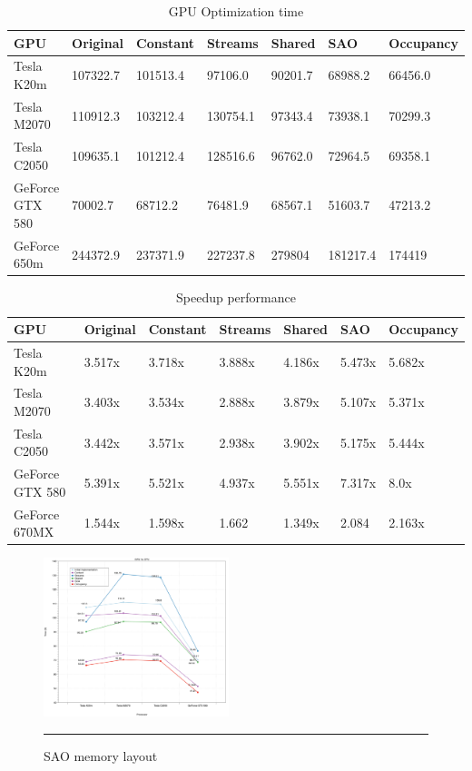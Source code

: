 \begin{table}[h]
\centering
  \begin{tabular} { |  l  |  l | l  |  l  | l | l | l |}
    \hline
    GPU & Original & Constant & Streams & Shared & SAO & Occupancy \\
    \hline
    Tesla K20m & 107322.7 & 101513.4 & 97106.0 & 90201.7 & 68988.2 & 66456.0\\
   \hline
    Tesla M2070 & 110912.3 & 103212.4 & 130754.1 & 97343.4 & 73938.1 & 70299.3\\
    \hline
    Tesla C2050 & 109635.1 & 101212.4 & 128516.6 & 96762.0 & 72964.5 & 69358.1\\
   \hline
    GeForce GTX 580 & 70002.7 & 68712.2 & 76481.9 & 68567.1 & 51603.7 & 47213.2\\
   \hline
    GeForce 650m & 244372.9 & 237371.9 & 227237.8 & 279804 & 181217.4 & 174419\\
   \hline
  \end{tabular}
    \caption{GPU Optimization time}
  \label{tab:time}
  \end{table}
  
  \begin{table}[h]
\centering
  \begin{tabular} { |  l  |  l | l  |  l  | l | l | l |}
    \hline
    GPU & Original & Constant & Streams & Shared & SAO & Occupancy\\
    \hline
    Tesla K20m & 3.517x & 3.718x & 3.888x & 4.186x & 5.473x & 5.682x\\
   \hline
    Tesla M2070 & 3.403x & 3.534x & 2.888x & 3.879x & 5.107x & 5.371x\\
    \hline
    Tesla C2050 & 3.442x & 3.571x & 2.938x & 3.902x & 5.175x & 5.444x\\
   \hline
    GeForce GTX 580 & 5.391x & 5.521x & 4.937x & 5.551x & 7.317x & 8.0x\\
   \hline
    GeForce 670MX & 1.544x & 1.598x & 1.662 & 1.349x & 2.084 & 2.163x\\
   \hline
  \end{tabular}
    \caption{Speedup performance}
  \label{tab:speed}
  \end{table}

\begin{figure}[htbp]
	\centering
		\includegraphics[width=0.48\textwidth]{Figures/gpuOptimization.png}
		\rule{35em}{0.2pt}
	\caption[Structure of Arrays (SAO)]{SAO memory layout}
	\label{fig:sao}
\end{figure}

